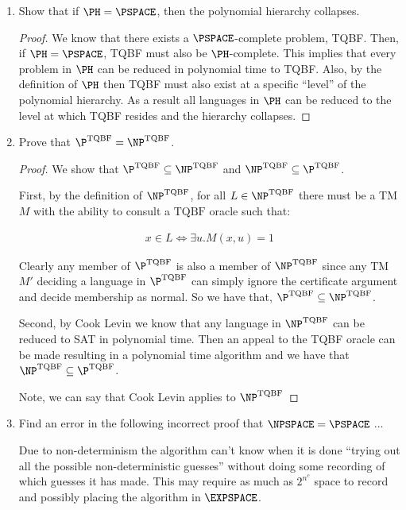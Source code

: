 \documentclass[usletter]{article}
\begin{document}
\begin{enumerate}
    \item Show that if $\PH = \PSPACE$, then the polynomial hierarchy collapses.

      \begin{proof}
        We know that there exists a $\PSPACE$-complete problem, TQBF. Then, if $\PH = \PSPACE$, TQBF must also be $\PH$-complete. This implies that every problem in $\PH$ can be reduced in polynomial time to TQBF. Also, by the definition of $\PH$ then TQBF must also exist at a specific ``level'' of the polynomial hierarchy. As a result all languages in $\PH$ can be reduced to the level at which TQBF resides and the hierarchy collapses.
      \end{proof}

    \newpage

    \item Prove that $\P^{\text{TQBF}} = \NP^{\text{TQBF}}$.

      \begin{proof}
        We show that $\P^{\text{TQBF}} \subseteq \NP^{\text{TQBF}}$ and $\NP^{\text{TQBF}} \subseteq \P^{\text{TQBF}}$.

        First, by the definition of $\NP^{\text{TQBF}}$, for all $L \in \NP^{\text{TQBF}}$ there must be a TM $M$ with the ability to consult a $\text{TQBF}$ oracle such that:

      \begin{align}
        x \in L \iff \exists u.M(x,u) = 1
      \end{align}

      Clearly any member of $\P^{\text{TQBF}}$ is also a member of $\NP^{\text{TQBF}}$ since any TM $M'$ deciding a language in $\P^{\text{TQBF}}$ can simply ignore the certificate argument and decide membership as normal. So we have that, $\P^{\text{TQBF}} \subseteq \NP^{\text{TQBF}}$.

      Second, by Cook Levin we know that any language in $\NP^{\text{TQBF}}$ can be reduced to SAT in polynomial time. Then an appeal to the TQBF oracle can be made resulting in a polynomial time algorithm and we have that $\NP^{\text{TQBF}} \subseteq \P^{\text{TQBF}}$.

      Note, we can say that Cook Levin applies to $\NP^{\text{TQBF}}$

      \end{proof}

    \item Find an error in the following incorrect proof that $\NPSPACE = \PSPACE$ ...

      Due to non-determinism the algorithm can't know when it is done ``trying out all the possible non-deterministic guesses'' without doing some recording of which guesses it has made. This may require as much as $2^{n^c}$ space to record and possibly placing the algorithm in $\EXPSPACE$.

\end{enumerate}
\end{document}
